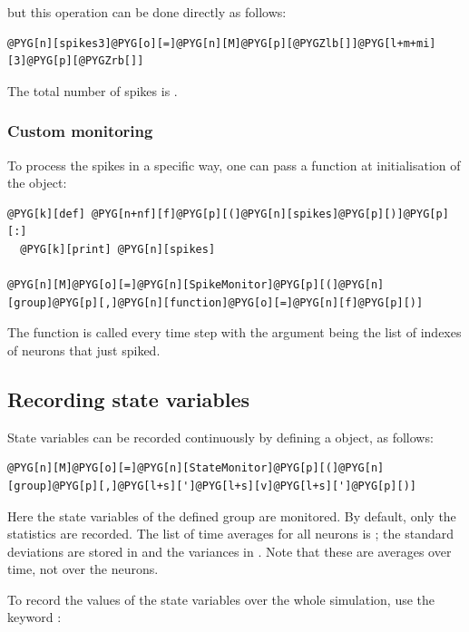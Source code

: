 \documentclass[letterpaper,10pt,english]{manual}
\begin{document}
but this operation can be done directly as follows:

\begin{Verbatim}[commandchars=@\[\]]
@PYG[n][spikes3]@PYG[o][=]@PYG[n][M]@PYG[p][@PYGZlb[]]@PYG[l+m+mi][3]@PYG[p][@PYGZrb[]]
\end{Verbatim}

The total number of spikes is .


\subsubsection{Custom monitoring}

To process the spikes in a specific way, one can pass a function at initialisation of the
\hyperlink{brian.SpikeMonitor}{} object:

\begin{Verbatim}[commandchars=@\[\]]
@PYG[k][def] @PYG[n+nf][f]@PYG[p][(]@PYG[n][spikes]@PYG[p][)]@PYG[p][:]
  @PYG[k][print] @PYG[n][spikes]

@PYG[n][M]@PYG[o][=]@PYG[n][SpikeMonitor]@PYG[p][(]@PYG[n][group]@PYG[p][,]@PYG[n][function]@PYG[o][=]@PYG[n][f]@PYG[p][)]
\end{Verbatim}

The function  is called every time step with the argument  being the list of
indexes of neurons that just spiked.


\subsection{Recording state variables}

State variables can be recorded continuously by defining a \hyperlink{brian.StateMonitor}{} object, as follows:

\begin{Verbatim}[commandchars=@\[\]]
@PYG[n][M]@PYG[o][=]@PYG[n][StateMonitor]@PYG[p][(]@PYG[n][group]@PYG[p][,]@PYG[l+s][']@PYG[l+s][v]@PYG[l+s][']@PYG[p][)]
\end{Verbatim}

Here the state variables  of the defined group are monitored. By default, only the statistics
are recorded. The list of time averages for all neurons is ; the standard deviations are stored
in  and the variances in . Note that these are averages over time, not over the neurons.

To record the values of the state variables over the whole simulation, use the keyword :
\end{document}

